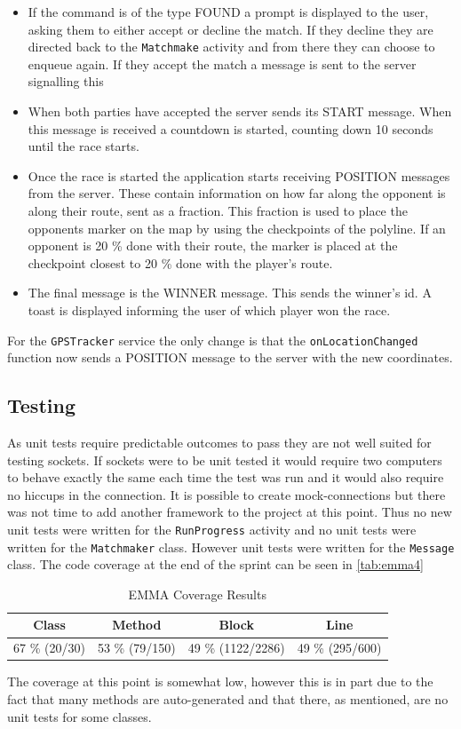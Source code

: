 \begin{itemize}
	\item{If the command is of the type FOUND a prompt is displayed to the user, asking them to either accept or decline the match. If they decline they are directed back to the \texttt{Matchmake} activity and from there they can choose to enqueue again. If they accept the match a message is sent to the server signalling this}
	\item{When both parties have accepted the server sends its START message. When this message is received a countdown is started, counting down 10 seconds until the race starts.}
	\item{Once the race is started the application starts receiving POSITION messages from the server. These contain information on how far along the opponent is along their route, sent as a fraction. This fraction is used to place the opponents marker on the map by using the checkpoints of the polyline. If an opponent is 20 \% done with their route, the marker is placed at the checkpoint closest to 20 \% done with the player's route.}
	\item{The final message is the WINNER message. This sends the winner's id. A toast is displayed informing the user of which player won the race.}
\end{itemize}

For the \texttt{GPSTracker} service the only change is that the \texttt{onLocationChanged} function now sends a POSITION message to the server with the new coordinates.

\subsection{Testing}
As unit tests require predictable outcomes to pass they are not well suited for testing sockets. If sockets were to be unit tested it would require two computers to behave exactly the same each time the test was run and it would also require no hiccups in the connection. It is possible to create mock-connections but there was not time to add another framework to the project at this point. Thus no new unit tests were written for the \texttt{RunProgress} activity and no unit tests were written for the \texttt{Matchmaker} class. However unit tests were written for the \texttt{Message} class.
The code coverage at the end of the sprint can be seen in \autoref{tab:emma4}

\begin{table}[!ht]
	\centering
	\begin{tabular}{| c | c | c | c |}
		\hline
		\textbf{Class} & \textbf{Method} & \textbf{Block} & \textbf{Line} \\ \hline
		67 \% (20/30) & 53 \% (79/150) & 49 \% (1122/2286) & 49 \% (295/600) \\
		\hline
	\end{tabular}
	\caption{EMMA Coverage Results}
	\label{tab:emma4}
\end{table}

The coverage at this point is somewhat low, however this is in part due to the fact that many methods are auto-generated and that there, as mentioned, are no unit tests for some classes.
